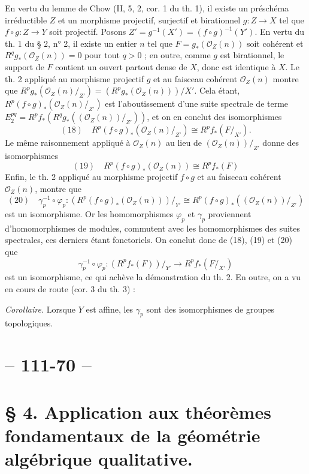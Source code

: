 En vertu du lemme de Chow (II, 5, 2, cor. 1 du th. 1), il existe un préschéma irréductible $Z$ et un morphisme projectif, surjectif et birationnel $g : Z \to X$ tel que $f \circ g : Z \to Y$ soit projectif. Posons $Z' = g^{-1}(X') = (f \circ g)^{-1}(Y')$. En vertu du th. 1 du § 2, n° 2, il existe un entier $n$ tel que $F = g_*(\mathcal{O}_Z(n))$ soit cohérent et $R^qg_*(\mathcal{O}_Z(n)) = 0$ pour tout $q > 0$ ; en outre, comme $g$ est birationnel, le support de $F$ contient un ouvert partout dense de $X$, donc est identique à $X$. Le th. 2 appliqué au morphisme projectif $g$ et au faisceau cohérent $\mathcal{O}_Z(n)$ montre que $R^pg_*(\mathcal{O}_Z(n)/_{Z'}) = (R^pg_*(\mathcal{O}_Z(n)))/X'$. Cela étant, $R^p(f \circ g)_*(\mathcal{O}_Z(n)/_{Z'})$ est l'aboutissement d'une suite spectrale de terme $E_2^{pq} = R^pf_*(R^qg_*((\mathcal{O}_Z(n))/_{Z'}))$, et on en conclut des isomorphismes
$$(18) \quad R^p(f \circ g)_*(\mathcal{O}_Z(n)/_{Z'}) \cong R^pf_*(F/_{X'}).$$
Le même raisonnement appliqué à $\mathcal{O}_Z(n)$ au lieu de $(\mathcal{O}_Z(n))/_{Z'}$ donne des isomorphismes
$$(19) \quad R^p(f \circ g)_*(\mathcal{O}_Z(n)) \cong R^pf_*(F)$$
Enfin, le th. 2 appliqué au morphisme projectif $f \circ g$ et au faisceau cohérent $\mathcal{O}_Z(n)$, montre que
$$(20) \quad \gamma_p^{-1} \circ \varphi_p : (R^p(f \circ g)_*(\mathcal{O}_Z(n)))/_{Y'} \cong R^p(f \circ g)_*((\mathcal{O}_Z(n))/_{Z'})$$
est un isomorphisme. Or les homomorphismes $\varphi_p$ et $\gamma_p$ proviennent d'homomorphismes de modules, commutent avec les homomorphismes des suites spectrales, ces derniers étant fonctoriels. On conclut donc de (18), (19) et (20) que
$$\gamma_p^{-1} \circ \varphi_p : (R^pf_*(F))/_{Y'} \to R^pf_*(F/_{X'})$$
est un isomorphisme, ce qui achève la démonstration du th. 2. En outre, on a vu en cours de route (cor. 3 du th. 3) :

\emph{Corollaire.} Lorsque $Y$ est affine, les $\gamma_p$ sont des isomorphismes de groupes topologiques.

\newpage



\section*{-- 111-70 --}

\section*{§ 4. Application aux théorèmes fondamentaux de la géométrie algébrique qualitative.}

